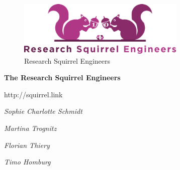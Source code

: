 \documentclass[twocolumn]{autart}
\begin{document}
\begin{ack}                               

\begin{figure}[!htb]
\begin{center}
\includegraphics[width=8cm]{rse_logo.png}
\caption{Research Squirrel Engineers}
\label{rq1}
\end{center}
\end{figure}

\textbf{The Research Squirrel Engineers}

http://squirrel.link

\textit{Sophie Charlotte Schmidt}

\textit{Martina Trognitz}

\textit{Florian Thiery}

\textit{Timo Homburg}

\end{ack}



\end{document}

